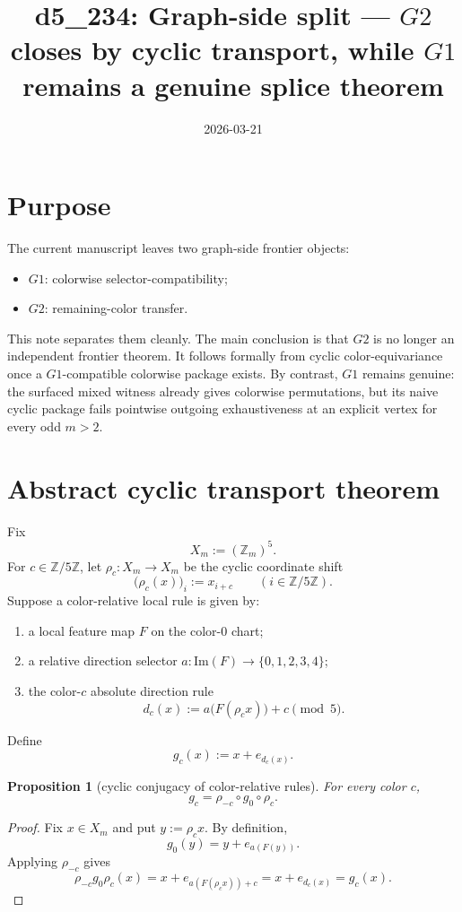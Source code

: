 \documentclass[11pt]{article}
\title{d5\_234: Graph-side split --- \(G2\) closes by cyclic transport, while \(G1\) remains a genuine splice theorem}
\author{}
\date{2026-03-21}
\newtheorem{proposition}[theorem]{Proposition}
\newcommand{\Zm}{\mathbb Z_m}
\newcommand{\Xm}{X_m}
\newcommand{\rhoc}[1]{\rho_{#1}}
\begin{document}
\maketitle

\section{Purpose}
The current manuscript leaves two graph-side frontier objects:
\begin{itemize}[leftmargin=2.4em]
\item \(G1\): colorwise selector-compatibility;
\item \(G2\): remaining-color transfer.
\end{itemize}
This note separates them cleanly.
The main conclusion is that \(G2\) is no longer an independent frontier theorem.
It follows formally from cyclic color-equivariance once a \(G1\)-compatible colorwise package exists.
By contrast, \(G1\) remains genuine: the surfaced mixed witness already gives
colorwise permutations, but its naive cyclic package fails pointwise outgoing
exhaustiveness at an explicit vertex for every odd \(m>2\).

\section{Abstract cyclic transport theorem}
Fix
\[
\Xm := (\Zm)^5.
\]
For \(c\in\mathbb Z/5\mathbb Z\), let \(\rhoc{c}:\Xm\to\Xm\) be the cyclic
coordinate shift
\[
\bigl(\rhoc{c}(x)\bigr)_i := x_{i+c}
\qquad (i\in\mathbb Z/5\mathbb Z).
\]
Suppose a color-relative local rule is given by:
\begin{enumerate}[label=\textup{(\arabic*)},leftmargin=2.8em]
\item a local feature map \(F\) on the color-$0$ chart;
\item a relative direction selector
      \(a\colon \mathrm{Im}(F)\to\{0,1,2,3,4\}\);
\item the color-$c$ absolute direction rule
      \[
      d_c(x) := a\bigl(F(\rhoc{c}x)\bigr)+c \pmod 5.
      \]
\end{enumerate}
Define
\[
 g_c(x):=x+e_{d_c(x)}.
\]

\begin{proposition}[cyclic conjugacy of color-relative rules]
\label{prop:cyclic-conjugacy}
For every color \(c\),
\[
 g_c = \rho_{-c}\circ g_0\circ \rho_c.
\]
\end{proposition}

\begin{proof}
Fix \(x\in X_m\) and put \(y:=\rho_c x\).
By definition,
\[
 g_0(y)=y+e_{a(F(y))}.
\]
Applying \(\rho_{-c}\) gives
\[
 \rho_{-c}g_0\rho_c(x)=x+e_{a(F(\rho_c x))+c}=x+e_{d_c(x)}=g_c(x).
\]
\end{proof}
\end{document}
